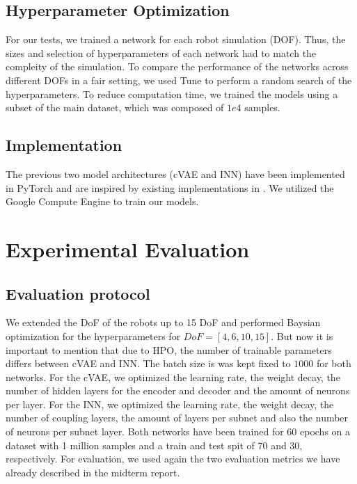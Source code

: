 \documentclass[conference]{IEEEtran}
\begin{document}
\subsection*{Hyperparameter Optimization}

For our tests, we trained a network for each robot simulation (DOF). Thus, the sizes and selection of hyperparameters of each network had to match the compleity of the simulation. To compare the performance of the networks across different DOFs in a fair setting, we used Tune \cite{liaw2018tune} to perform a random search of the hyperparameters. To reduce computation time, we trained the models using a subset of the main dataset, which was composed of \( 1e4 \) samples.


\subsection*{Implementation}

The previous two model architectures (cVAE and INN) have been implemented in PyTorch and are inspired by existing implementations in  \cite{graviraja2019, freia2020}. We utilized the Google Compute Engine to train our models.

\section*{Experimental Evaluation}

\subsection*{Evaluation protocol}

We extended the DoF of the robots up to 15 DoF and performed Baysian optimization for the hyperparameters for $DoF = [4, 6, 10, 15]$. But now it is important to mention that due to HPO, the number of trainable parameters differs between cVAE and INN. The batch size is was kept fixed to $1000$ for both networks.
For the cVAE, we optimized the learning rate, the weight decay, the number of hidden layers for the encoder and decoder and the amount of neurons per layer. For the INN, we optimized the learning rate, the weight decay, the number of coupling layers, the amount of layers per subnet and also the number of neurons per subnet layer.
Both networks have been trained for 60 epochs on a dataset with 1 million samples and a train and test spit of 70 and 30, respectively. For evaluation, we used again the two evaluation metrics  we have already described in the midterm report.
\end{document}
